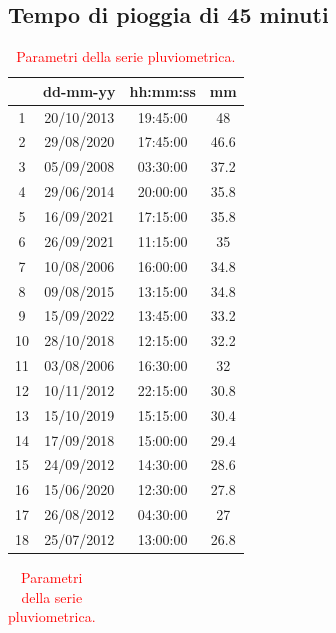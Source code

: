 \subsection{Tempo di pioggia di 45 minuti}

\begin{table}[H]
    \caption*{Evento pluviometrico di 45 minuti.}
    \begin{minipage}{.5\linewidth}
      \caption{\textcolor{red}{Campione della serie pluviometrica.}}
      \centering
        \begin{tabular}{cccc}
            \toprule
            & dd-mm-yy   & hh:mm:ss & mm \\
         \midrule
         1  & 20/10/2013 & 19:45:00 & 48   \\
         2  & 29/08/2020 & 17:45:00 & 46.6 \\
         3  & 05/09/2008 & 03:30:00 & 37.2 \\
         4  & 29/06/2014 & 20:00:00 & 35.8 \\
         5  & 16/09/2021 & 17:15:00 & 35.8 \\
         6  & 26/09/2021 & 11:15:00 & 35   \\
         7  & 10/08/2006 & 16:00:00 & 34.8 \\
         8  & 09/08/2015 & 13:15:00 & 34.8 \\
         9  & 15/09/2022 & 13:45:00 & 33.2 \\
         10 & 28/10/2018 & 12:15:00 & 32.2 \\
         11 & 03/08/2006 & 16:30:00 & 32   \\
         12 & 10/11/2012 & 22:15:00 & 30.8 \\
         13 & 15/10/2019 & 15:15:00 & 30.4 \\
         14 & 17/09/2018 & 15:00:00 & 29.4 \\
         15 & 24/09/2012 & 14:30:00 & 28.6 \\
         16 & 15/06/2020 & 12:30:00 & 27.8 \\
         17 & 26/08/2012 & 04:30:00 & 27   \\
         18 & 25/07/2012 & 13:00:00 & 26.8 \\
         \bottomrule
        \end{tabular}
    \end{minipage}%
    \begin{minipage}{.5\linewidth}
      \centering
        \caption{\textcolor{red}{Parametri della serie pluviometrica.}}
        \begin{tabular}{cc}

\end{tabular}
\end{minipage}
\end{table}
